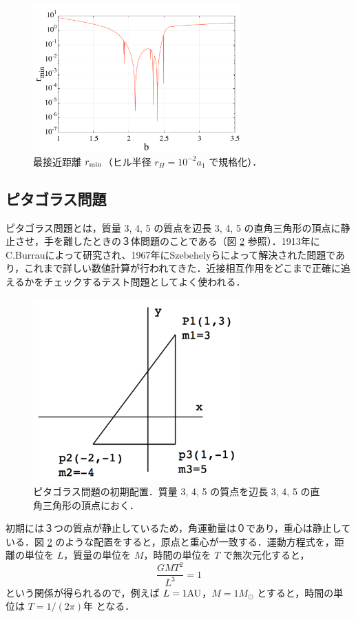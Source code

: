 \documentclass[11pt,a4paper,oneside,onecolumn]{jreport}
\begin{document}
\begin{figure}[H]
\centering
\includegraphics[width=8cm]{./image/planetesimal_r_min.pdf}
\caption{最接近距離 $r_{\rm min}$（ヒル半径 $r_H = 10^{-2} a_1$ で規格化）．\label{fig:r_min}}
\end{figure}




\subsection{ピタゴラス問題}
ピタゴラス問題とは，質量 3, 4, 5 の質点を辺長 3, 4, 5 の直角三角形の頂点に静止させ，手を離したときの３体問題のことである（図 \ref{fig:pythagoras} 参照）．1913年にC.Burrauによって研究され、1967年にSzebehelyらによって解決された問題であり，これまで詳しい数値計算が行われてきた．近接相互作用をどこまで正確に追えるかをチェックするテスト問題としてよく使われる．

\begin{figure}[H]
\centering
\includegraphics[width=8cm]{./image/pythagoras_1.pdf}
\caption{ピタゴラス問題の初期配置．質量 3, 4, 5 の質点を辺長 3, 4, 5 の直角三角形の頂点におく．\label{fig:pythagoras}}
\end{figure}

初期には３つの質点が静止しているため，角運動量は０であり，重心は静止している．図 \ref{fig:pythagoras} のような配置をすると，原点と重心が一致する．運動方程式を，距離の単位を $L$，質量の単位を $M$，時間の単位を $T$ で無次元化すると，
\begin{equation}
\frac{G M T^2}{L^3} = 1
\end{equation}
という関係が得られるので，例えば $L = 1 {\rm AU}$，$M = 1 M_{\odot}$ とすると，時間の単位は $T = 1/(2 \pi) 年$ となる．
\end{document}

